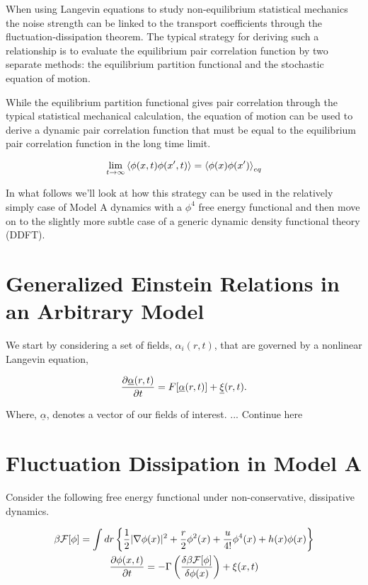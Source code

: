 When using Langevin equations to study non-equilibrium statistical mechanics the noise strength can be linked to the transport coefficients through the fluctuation-dissipation theorem. The typical strategy for deriving such a relationship is to evaluate the equilibrium pair correlation function by two separate methods: the equilibrium partition functional and the stochastic equation of motion.

While the equilibrium partition functional gives pair correlation through the typical statistical mechanical calculation, the equation of motion can be used to derive a dynamic pair correlation function that must be equal to the equilibrium pair correlation function in the long time limit.

\begin{equation}
	\lim_{t \rightarrow \infty} \left\langle \phi(x, t) \phi(x^\prime, t) \right\rangle = \left\langle\phi(x)\phi(x^\prime) \right\rangle_{eq}
\end{equation}

In what follows we'll look at how this strategy can be used in the relatively simply case of Model A dynamics with a $\phi^4$ free energy functional and then move on to the slightly more subtle case of a generic dynamic density functional theory (DDFT).

\section{Generalized Einstein Relations in an Arbitrary Model}

We start by considering a set of fields, $\alpha_i(r, t)$, that are governed by a nonlinear Langevin equation,

\begin{equation}
	\frac{\partial \underline{\alpha}(r, t)}{\partial t} = F[\underline{\alpha}(r,t)] + \underline{\xi}(r,t).
\end{equation}

Where, $\underline{\alpha}$, denotes a vector of our fields of interest. ... Continue here

\section{Fluctuation Dissipation in Model A}

Consider the following free energy functional under non-conservative, dissipative dynamics.

\begin{gather}
\beta \mathcal{F}[\phi] = \int dr \left\lbrace \frac{1}{2}\vert \nabla \phi(x) \vert^2 + \frac{r}{2}\phi^2(x) + \frac{u}{4!}\phi^4(x)  + h(x)\phi(x)\right\rbrace \\
\frac{\partial \phi(x,t)}{\partial t} = -\Gamma \left(\frac{\delta \beta \mathcal{F}[\phi]}{\delta \phi(x)}\right) + \xi(x, t)
\end{gather}

